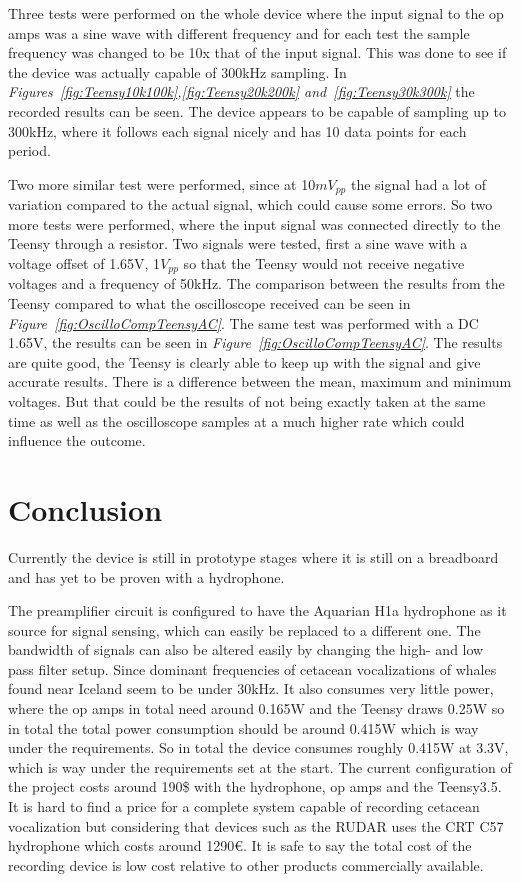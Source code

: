 Three tests were performed on the whole device where the input signal to the op amps was a sine wave with different frequency and for each test the sample frequency was changed to be 10x that of the input signal.
This was done to see if the device was actually capable of 300kHz sampling.
In \textit{Figures~\ref{fig:Teensy10k100k},\ref{fig:Teensy20k200k} and~\ref{fig:Teensy30k300k}} the recorded results can be seen.
The device appears to be capable of sampling up to 300kHz, where it follows each signal nicely and has 10 data points for each period.

Two more similar test were performed, since at 10$mV_{pp}$ the signal had a lot of variation compared to the actual signal, which could cause some errors.
So two more tests were performed, where the input signal was connected directly to the Teensy through a resistor.
Two signals were tested, first a sine wave with a voltage offset of 1.65V, 1$V_{pp}$ so that the Teensy would not receive negative voltages and a frequency of 50kHz.
The comparison between the results from the Teensy compared to what the oscilloscope received can be seen in \textit{Figure~\ref{fig:OscilloCompTeensyAC}}.
The same test was performed with a DC 1.65V, the results can be seen in \textit{Figure~\ref{fig:OscilloCompTeensyAC}}. 
The results are quite good, the Teensy is clearly able to keep up with the signal and give accurate results.
There is a difference between the mean, maximum and minimum voltages. 
But that could be the results of not being exactly taken at the same time as well as the oscilloscope samples at a much higher rate which could influence the outcome.


\clearpage


\section{Conclusion}\label{sec:conclusions}

Currently the device is still in prototype stages where it is still on a breadboard and has yet to be proven with a hydrophone.

The preamplifier circuit is configured to have the Aquarian H1a hydrophone as it source for signal sensing, which can easily be replaced to a different one.
The bandwidth of signals can also be altered easily by changing the high- and low pass filter setup.
Since dominant frequencies of cetacean vocalizations of whales found near Iceland seem to be under 30kHz.
It also consumes very little power, where the op amps in total need around 0.165W and the Teensy draws 0.25W so in total the total power consumption should be around 0.415W which is way under the requirements.
So in total the device consumes roughly 0.415W at 3.3V, which is way under the requirements set at the start.
The current configuration of the project costs around 190\$ with the hydrophone, op amps and the Teensy3.5.
It is hard to find a price for a complete system capable of recording cetacean vocalization but considering that devices such as the RUDAR uses the CRT C57 hydrophone which costs around 1290€.
It is safe to say the total cost of the recording device is low cost relative to other products commercially available.

